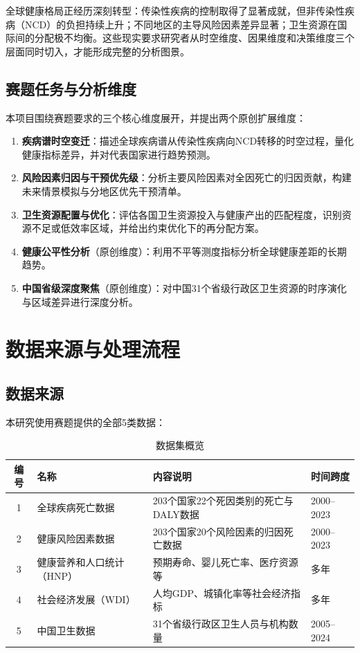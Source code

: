\documentclass[12pt,a4paper]{ctexart}
\begin{document}
全球健康格局正经历深刻转型：传染性疾病的控制取得了显著成就，但非传染性疾病（NCD）的负担持续上升；不同地区的主导风险因素差异显著；卫生资源在国际间的分配极不均衡。这些现实要求研究者从时空维度、因果维度和决策维度三个层面同时切入，才能形成完整的分析图景。

\subsection{赛题任务与分析维度}

本项目围绕赛题要求的三个核心维度展开，并提出两个原创扩展维度：

\begin{enumerate}[label=\textbf{D\arabic*.},leftmargin=2.5em]
    \item \textbf{疾病谱时空变迁}：描述全球疾病谱从传染性疾病向NCD转移的时空过程，量化健康指标差异，并对代表国家进行趋势预测。
    \item \textbf{风险因素归因与干预优先级}：分析主要风险因素对全因死亡的归因贡献，构建未来情景模拟与分地区优先干预清单。
    \item \textbf{卫生资源配置与优化}：评估各国卫生资源投入与健康产出的匹配程度，识别资源不足或低效率区域，并给出约束优化下的再分配方案。
    \item \textbf{健康公平性分析}（原创维度）：利用不平等测度指标分析全球健康差距的长期趋势。
    \item \textbf{中国省级深度聚焦}（原创维度）：对中国31个省级行政区卫生资源的时序演化与区域差异进行深度分析。
\end{enumerate}

\section{数据来源与处理流程}

\subsection{数据来源}

本研究使用赛题提供的全部5类数据：

\begin{table}[H]
\centering
\caption{数据集概览}
\label{tab:datasets}
\begin{tabularx}{\textwidth}{clXl}
\toprule
\textbf{编号} & \textbf{名称} & \textbf{内容说明} & \textbf{时间跨度} \\
\midrule
1 & 全球疾病死亡数据 & 203个国家22个死因类别的死亡与DALY数据 & 2000--2023 \\
2 & 健康风险因素数据 & 203个国家20个风险因素的归因死亡数据 & 2000--2023 \\
3 & 健康营养和人口统计（HNP） & 预期寿命、婴儿死亡率、医疗资源等 & 多年 \\
4 & 社会经济发展（WDI） & 人均GDP、城镇化率等社会经济指标 & 多年 \\
5 & 中国卫生数据 & 31个省级行政区卫生人员与机构数量 & 2005--2024 \\
\bottomrule
\end{tabularx}
\end{table}
\end{document}
